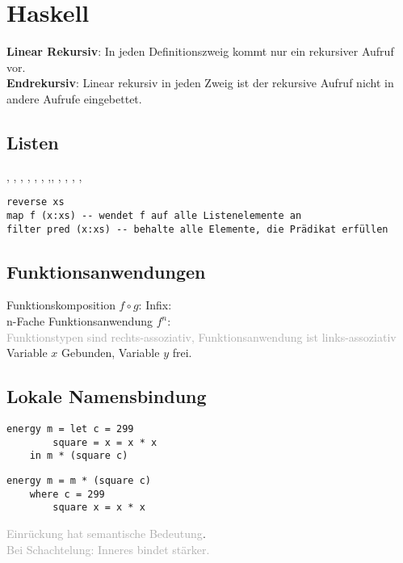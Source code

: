 \documentclass{Zusammenfassung}
\begin{document}
\makeTitleAndTOC
%
%

\section{Haskell}\label{sec:haskell}
\textbf{Linear Rekursiv}: In jeden Definitionszweig kommt nur ein rekursiver Aufruf vor.\\
\textbf{Endrekursiv}: Linear rekursiv in jeden Zweig ist  der rekursive Aufruf nicht in andere Aufrufe eingebettet.\\
\subsection{Listen}\label{subsec:listen}
\haskellinline{[]}, , ,
, ,
,
,, ,
,
,
,
\begin{verbatim}
reverse xs
map f (x:xs) -- wendet f auf alle Listenelemente an
filter pred (x:xs) -- behalte alle Elemente, die Prädikat erfüllen
\end{verbatim}
\subsection{Funktionsanwendungen}\label{subsec:funktionsanwendungen}
Funktionskomposition $f \circ g$:  Infix: \\
n-Fache Funktionsanwendung $f^n$: \\
\textcolor{darkgray}{Funktionstypen sind rechts-assoziativ, Funktionsanwendung ist links-assoziativ}\\
 Variable $x$ Gebunden, Variable $y$ frei.\\
\subsection{Lokale Namensbindung}\label{subsec:lokale-namensbindung}
\begin{multicols}{2}
    \begin{verbatim}
energy m = let c = 299
        square = x = x * x
    in m * (square c)
    \end{verbatim}
\columnbreak
    \begin{verbatim}
energy m = m * (square c)
    where c = 299
        square x = x * x
    \end{verbatim}
\end{multicols}
\textcolor{darkgray}{Einrückung hat semantische Bedeutung}.\\
\textcolor{darkgray}{Bei Schachtelung: Inneres  bindet stärker.}\\
\end{document}
